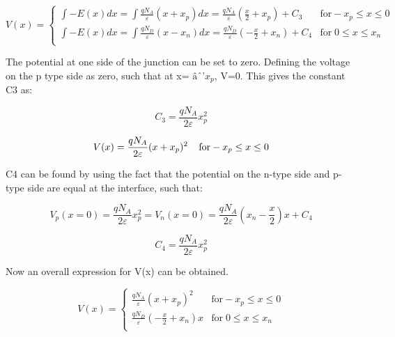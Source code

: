 \begin{equation}
V(x) = \begin{cases}
       \int -E(x)dx=\int \frac{qN_{A}}{\varepsilon}(x+x_{p}) dx = \frac{qN_{A}}{\varepsilon}(\frac{x}{2}+x_{p})+ C_{3} & \text{for}  -x_{p}\leq x \leq 0 \\
       \int -E(x)dx=\int \frac{qN_{D}}{\varepsilon}(x-x_{n}) dx = \frac{qN_{D}}{\varepsilon}(-\frac{x}{2}+x_{n})+ C_{4}  &  \text{for} \; 0 \leq x \leq x_{n}  \\
     \end{cases}
\end{equation}

The potential at one side of the junction can be set to zero. Defining the voltage on the p type side as zero, such that at x= $âˆ’x_p$, V=0. This gives the constant C3 as:


\begin{equation}
C_{3}=\frac{qN_{A}}{2\varepsilon}x_{p}^{2}
\end{equation}

\begin{equation}
V(x)=\frac{qN_{A}}{2\varepsilon}(x+x_{p})^{2}  \; \; \;\;  \text{for}  -x_{p}\leq x \leq 0 \\
\end{equation}

C4 can be found by using the fact that the potential on the n-type side and p-type side are equal at the interface, such that:

\begin{equation}
V_{p}(x=0)=\frac{qN_{A}}{2\varepsilon}x_{p}^2=V_{n}(x=0)=\frac{qN_{A}}{2\varepsilon}(x_{n}-\frac{x}{2})x+C_{4}
\end{equation}

\begin{equation}
C_{4}=\frac{qN_{A}}{2\varepsilon}x_{p}^2
\end{equation}

Now an overall expression for V(x) can be obtained.

\begin{equation}
V(x) = \begin{cases}
       \frac{qN_{A}}{\varepsilon}(x+x_{p})^2 & \text{for}  -x_{p}\leq x \leq 0 \\
       \frac{qN_{D}}{\varepsilon}(-\frac{x}{2}+x_{n})x  &  \text{for} \; 0 \leq x \leq x_{n}  \\
     \end{cases}
\end{equation}

